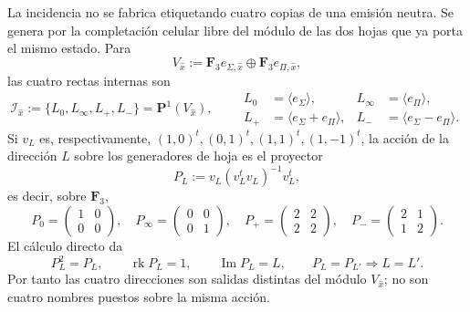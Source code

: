 La incidencia no se fabrica etiquetando cuatro copias de una emisión neutra.
Se genera por la completación celular libre del módulo de las dos hojas que
ya porta el mismo estado. Para
\[
 V_{\widehat x}:=\mathbf F_3e_{\Sigma,\widehat x}
 \oplus\mathbf F_3e_{\Pi,\widehat x},
\]
las cuatro rectas internas son
\begin{equation}
\label{eq:pdfv2-cor-cuatro-rectas-tpk}
 \mathscr I_{\widehat x}:=
 \{L_0,L_\infty,L_+,L_-\}
 =\mathbf P^1(V_{\widehat x}),\qquad
 \begin{aligned}
 L_0&=\langle e_\Sigma\rangle,&
 L_\infty&=\langle e_\Pi\rangle,\\
 L_+&=\langle e_\Sigma+e_\Pi\rangle,&
 L_-&=\langle e_\Sigma-e_\Pi\rangle.
 \end{aligned}
\end{equation}
Si \(v_L\) es, respectivamente,
\((1,0)^t,(0,1)^t,(1,1)^t,(1,-1)^t\), la acción de la dirección \(L\)
sobre los generadores de hoja es el proyector
\begin{equation}
\label{eq:pdfv2-cor-proyectores-cuatro-direcciones}
 P_L:=v_L(v_L^tv_L)^{-1}v_L^t,
\end{equation}
es decir, sobre \(\mathbf F_3\),
\[
 P_0=\begin{pmatrix}1&0\\0&0\end{pmatrix},\quad
 P_\infty=\begin{pmatrix}0&0\\0&1\end{pmatrix},\quad
 P_+=\begin{pmatrix}2&2\\2&2\end{pmatrix},\quad
 P_-=\begin{pmatrix}2&1\\1&2\end{pmatrix}.
\]
El cálculo directo da
\begin{equation}
\label{eq:pdfv2-cor-proyectores-no-colapso}
 P_L^2=P_L,\qquad \operatorname{rk}P_L=1,\qquad
 \operatorname{Im}P_L=L,\qquad
 P_L=P_{L'}\Longrightarrow L=L'.
\end{equation}
Por tanto las cuatro direcciones son salidas distintas del módulo
\(V_{\widehat x}\); no son cuatro nombres puestos sobre la misma acción.

